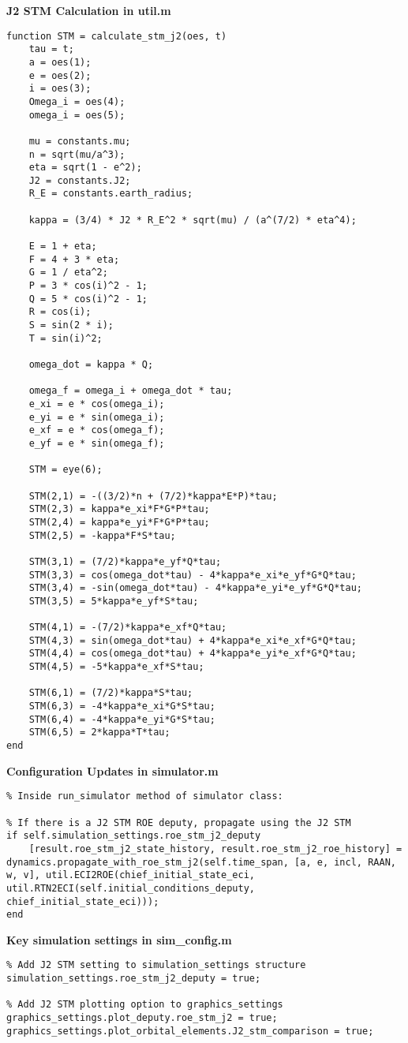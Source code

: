 \textbf{J2 STM Calculation in util.m}
\begin{lstlisting}
function STM = calculate_stm_j2(oes, t)         
    tau = t;
    a = oes(1);
    e = oes(2);
    i = oes(3);
    Omega_i = oes(4);
    omega_i = oes(5);
    
    mu = constants.mu;
    n = sqrt(mu/a^3);
    eta = sqrt(1 - e^2);
    J2 = constants.J2;
    R_E = constants.earth_radius;

    kappa = (3/4) * J2 * R_E^2 * sqrt(mu) / (a^(7/2) * eta^4);
    
    E = 1 + eta;
    F = 4 + 3 * eta;
    G = 1 / eta^2;
    P = 3 * cos(i)^2 - 1;
    Q = 5 * cos(i)^2 - 1;
    R = cos(i);
    S = sin(2 * i);
    T = sin(i)^2;
    
    omega_dot = kappa * Q;
    
    omega_f = omega_i + omega_dot * tau;
    e_xi = e * cos(omega_i);
    e_yi = e * sin(omega_i);
    e_xf = e * cos(omega_f);
    e_yf = e * sin(omega_f);
    
    STM = eye(6);
    
    STM(2,1) = -((3/2)*n + (7/2)*kappa*E*P)*tau;
    STM(2,3) = kappa*e_xi*F*G*P*tau;
    STM(2,4) = kappa*e_yi*F*G*P*tau;
    STM(2,5) = -kappa*F*S*tau;
    
    STM(3,1) = (7/2)*kappa*e_yf*Q*tau;
    STM(3,3) = cos(omega_dot*tau) - 4*kappa*e_xi*e_yf*G*Q*tau;
    STM(3,4) = -sin(omega_dot*tau) - 4*kappa*e_yi*e_yf*G*Q*tau;
    STM(3,5) = 5*kappa*e_yf*S*tau;
    
    STM(4,1) = -(7/2)*kappa*e_xf*Q*tau;
    STM(4,3) = sin(omega_dot*tau) + 4*kappa*e_xi*e_xf*G*Q*tau;
    STM(4,4) = cos(omega_dot*tau) + 4*kappa*e_yi*e_xf*G*Q*tau;
    STM(4,5) = -5*kappa*e_xf*S*tau;
    
    STM(6,1) = (7/2)*kappa*S*tau;
    STM(6,3) = -4*kappa*e_xi*G*S*tau;
    STM(6,4) = -4*kappa*e_yi*G*S*tau;
    STM(6,5) = 2*kappa*T*tau;
end
\end{lstlisting}

\textbf{Configuration Updates in simulator.m}
\begin{lstlisting}
% Inside run_simulator method of simulator class:

% If there is a J2 STM ROE deputy, propagate using the J2 STM
if self.simulation_settings.roe_stm_j2_deputy
    [result.roe_stm_j2_state_history, result.roe_stm_j2_roe_history] = dynamics.propagate_with_roe_stm_j2(self.time_span, [a, e, incl, RAAN, w, v], util.ECI2ROE(chief_initial_state_eci, util.RTN2ECI(self.initial_conditions_deputy, chief_initial_state_eci)));
end
\end{lstlisting}

\textbf{Key simulation settings in sim\_config.m}
\begin{lstlisting}
% Add J2 STM setting to simulation_settings structure
simulation_settings.roe_stm_j2_deputy = true;

% Add J2 STM plotting option to graphics_settings
graphics_settings.plot_deputy.roe_stm_j2 = true;
graphics_settings.plot_orbital_elements.J2_stm_comparison = true;
\end{lstlisting}